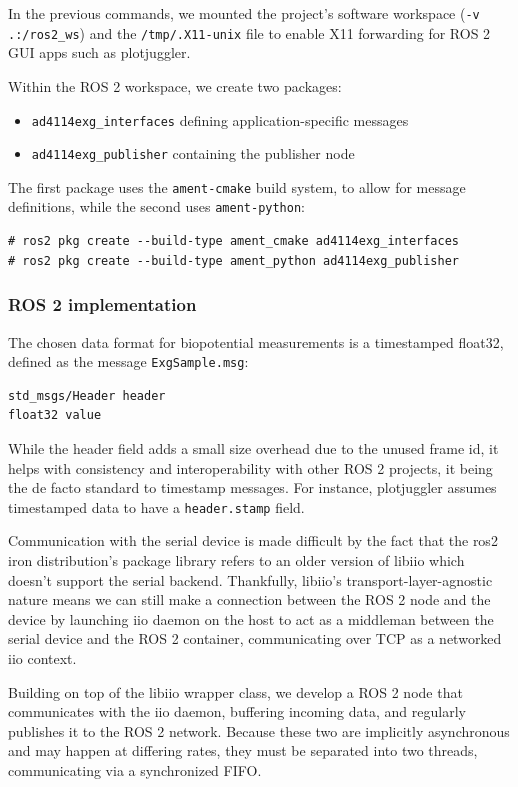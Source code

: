 \documentclass{thesis}
\begin{document}
In the previous commands, we mounted the project's software workspace (\texttt{-v .:/ros2\_ws}) and the \texttt{/tmp/.X11-unix} file to enable X11 forwarding for ROS 2 GUI apps such as plotjuggler.

Within the ROS 2 workspace, we create two packages:
\begin{itemize}
\item \texttt{ad4114exg\_interfaces} defining application-specific messages
\item \texttt{ad4114exg\_publisher} containing the publisher node
\end{itemize}

The first package uses the \texttt{ament-cmake} build system, to allow for message definitions, while the second uses \texttt{ament-python}:

\begin{verbatim}
# ros2 pkg create --build-type ament_cmake ad4114exg_interfaces
# ros2 pkg create --build-type ament_python ad4114exg_publisher
\end{verbatim}

\newpage
\subsubsection{ROS 2 implementation}

The chosen data format for biopotential measurements is a timestamped float32, defined as the message \texttt{ExgSample.msg}:

\begin{lstlisting}
std_msgs/Header header
float32 value
\end{lstlisting}

While the header field adds a small size overhead due to the unused frame id, it helps with consistency and interoperability with other ROS 2 projects, it being the de facto standard to timestamp messages. For instance, plotjuggler assumes timestamped data to have a \texttt{header.stamp} field.

Communication with the serial device is made difficult by the fact that the ros2 iron distribution's package library refers to an older version of libiio which doesn't support the serial backend. Thankfully, libiio's transport-layer-agnostic nature means we can still make a connection between the ROS 2 node and the device by launching iio daemon on the host to act as a middleman between the serial device and the ROS 2 container, communicating over TCP as a networked iio context.

Building on top of the libiio wrapper class, we develop a ROS 2 node that communicates with the iio daemon, buffering incoming data, and regularly publishes it to the ROS 2 network. Because these two are implicitly asynchronous and may happen at differing rates, they must be separated into two threads, communicating via a synchronized FIFO.
\end{document}
